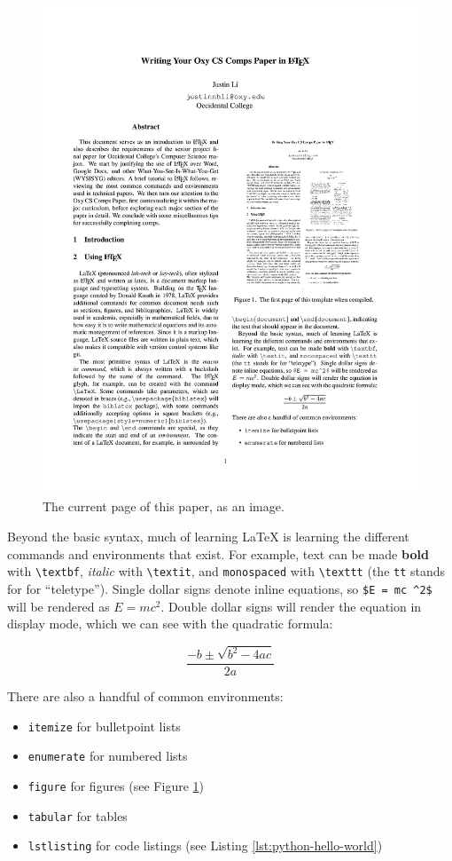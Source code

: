 \documentclass[10pt,twocolumn]{article}
\begin{document}
\begin{figure}
    \centering
    \includegraphics[width=.95\linewidth]{recursion.png}
    \caption{
        The current page of this paper, as an image.
    }
    \label{fig:first-page}
\end{figure}

Beyond the basic syntax, much of learning LaTeX is learning the different commands and environments that exist.
For example, text can be made \textbf{bold} with \texttt{\textbackslash textbf}, \textit{italic} with \texttt{\textbackslash textit}, and \texttt{monospaced} with \texttt{\textbackslash texttt} (the \texttt{tt} stands for for ``teletype'').
Single dollar signs denote inline equations, so \texttt{\$E = mc \textasciicircum 2\$} will be rendered as $E = mc^2$.
Double dollar signs will render the equation in display mode, which we can see with the quadratic formula:

$$\frac{{-b \pm \sqrt {b^2 - 4ac} }}{{2a}}$$

There are also a handful of common environments:

\begin{itemize}
    \item \texttt{itemize} for bulletpoint lists
    \item \texttt{enumerate} for numbered lists
    \item \texttt{figure} for figures (see Figure \ref{fig:first-page})
    \item \texttt{tabular} for tables
    \item \texttt{lstlisting} for code listings (see Listing \ref{lst:python-hello-world})
\end{itemize}
\end{document}
